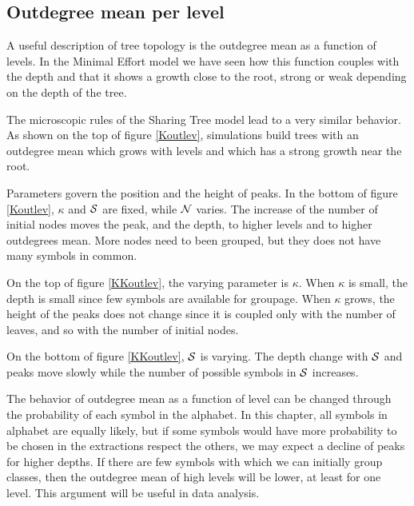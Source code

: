 \subsection{Outdegree mean per level}
A useful description of tree topology is the outdegree mean as a function of levels. In the Minimal Effort model we have seen how this function couples with the depth and that it shows a growth close to the root, strong or weak depending on the depth of the tree.

The microscopic rules of the Sharing Tree model lead to a very similar behavior. As shown on the top of figure \ref{Koutlev}, simulations build trees with an outdegree mean which grows with levels and which has a strong growth near the root.

Parameters govern the position and the height of peaks. In the bottom of figure \ref{Koutlev}, $\kappa$ and $\mathcal S$ are fixed, while $\mathcal N$ varies. The increase of the number of initial nodes moves the peak, and the depth, to higher levels and to higher outdegrees mean. More nodes need to been grouped, but they does not have many symbols in common.

On the top of figure \ref{KKoutlev}, the varying parameter is $\kappa$. When $\kappa$ is small, the depth is small since few symbols are available for groupage. When $\kappa$ grows, the height of the peaks does not change since it is coupled only with the number of leaves, and so with the number of initial nodes.

On the bottom of figure \ref{KKoutlev}, $\mathcal S$ is varying. The depth change with $\mathcal S$ and peaks move slowly while the number of possible symbols in $\mathcal S$ increases.

The behavior of outdegree mean as a function of level can be changed through the probability of each symbol in the alphabet. In this chapter, all symbols in alphabet are equally likely, but if some symbols would have more probability to be chosen in the extractions respect the others, we may expect a decline of peaks for higher depths. If there are few symbols with which we can initially group classes, then the outdegree mean of high levels will be lower, at least for one level. This argument will be useful in data analysis.

